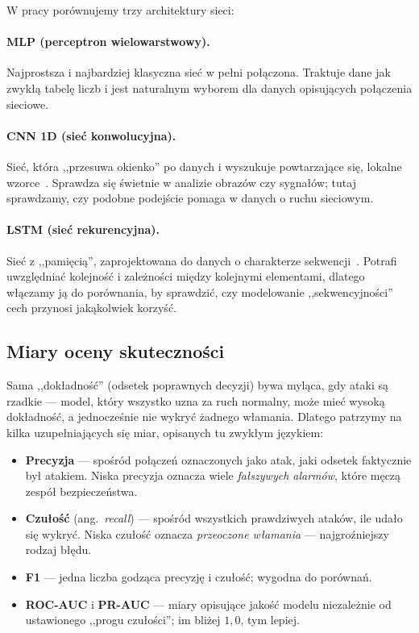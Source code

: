 W pracy porównujemy trzy architektury sieci:

\paragraph{MLP (perceptron wielowarstwowy).} Najprostsza i najbardziej klasyczna
sieć w pełni połączona. Traktuje dane jak zwykłą tabelę liczb i jest naturalnym
wyborem dla danych opisujących połączenia sieciowe.

\paragraph{CNN 1D (sieć konwolucyjna).} Sieć, która ,,przesuwa okienko'' po
danych i wyszukuje powtarzające się, lokalne wzorce~\cite{lecun1998gradient}.
Sprawdza się świetnie w analizie obrazów czy sygnałów; tutaj sprawdzamy, czy
podobne podejście pomaga w danych o ruchu sieciowym.

\paragraph{LSTM (sieć rekurencyjna).} Sieć z ,,pamięcią'', zaprojektowana do
danych o charakterze sekwencji~\cite{hochreiter1997long}. Potrafi uwzględniać
kolejność i zależności między kolejnymi elementami, dlatego włączamy ją do
porównania, by sprawdzić, czy modelowanie ,,sekwencyjności'' cech przynosi
jakąkolwiek korzyść.

\subsection{Miary oceny skuteczności}

Sama ,,dokładność'' (odsetek poprawnych decyzji) bywa myląca, gdy ataki są
rzadkie --- model, który wszystko uzna za ruch normalny, może mieć wysoką
dokładność, a jednocześnie nie wykryć żadnego włamania. Dlatego patrzymy na
kilka uzupełniających się miar, opisanych tu zwykłym językiem:

\begin{itemize}
  \item \textbf{Precyzja} --- spośród połączeń oznaczonych jako atak, jaki
        odsetek faktycznie był atakiem. Niska precyzja oznacza wiele
        \emph{fałszywych alarmów}, które męczą zespół bezpieczeństwa.
  \item \textbf{Czułość} (ang.\ \emph{recall}) --- spośród wszystkich
        prawdziwych ataków, ile udało się wykryć. Niska czułość oznacza
        \emph{przeoczone włamania} --- najgroźniejszy rodzaj błędu.
  \item \textbf{F1} --- jedna liczba godząca precyzję i czułość; wygodna do
        porównań.
  \item \textbf{ROC-AUC} i \textbf{PR-AUC} --- miary opisujące jakość modelu
        niezależnie od ustawionego ,,progu czułości''; im bliżej $1{,}0$, tym
        lepiej.
\end{itemize}

